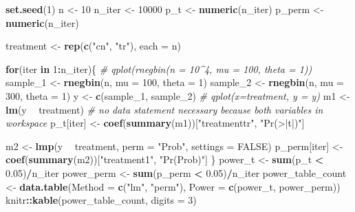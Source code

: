 \documentclass[]{book}
\newenvironment{Shaded}{\begin{snugshade}}{\end{snugshade}}
\newcommand{\CommentTok}[1]{\textcolor[rgb]{0.56,0.35,0.01}{\textit{#1}}}
\newcommand{\ControlFlowTok}[1]{\textcolor[rgb]{0.13,0.29,0.53}{\textbf{#1}}}
\newcommand{\DataTypeTok}[1]{\textcolor[rgb]{0.13,0.29,0.53}{#1}}
\newcommand{\DecValTok}[1]{\textcolor[rgb]{0.00,0.00,0.81}{#1}}
\newcommand{\FloatTok}[1]{\textcolor[rgb]{0.00,0.00,0.81}{#1}}
\newcommand{\KeywordTok}[1]{\textcolor[rgb]{0.13,0.29,0.53}{\textbf{#1}}}
\newcommand{\NormalTok}[1]{#1}
\newcommand{\OperatorTok}[1]{\textcolor[rgb]{0.81,0.36,0.00}{\textbf{#1}}}
\newcommand{\OtherTok}[1]{\textcolor[rgb]{0.56,0.35,0.01}{#1}}
\newcommand{\StringTok}[1]{\textcolor[rgb]{0.31,0.60,0.02}{#1}}
\begin{document}
\begin{Shaded}
\begin{Highlighting}[]
\KeywordTok{set.seed}\NormalTok{(}\DecValTok{1}\NormalTok{)}
\NormalTok{n <-}\StringTok{ }\DecValTok{10}
\NormalTok{n_iter <-}\StringTok{ }\DecValTok{10000}
\NormalTok{p_t <-}\StringTok{ }\KeywordTok{numeric}\NormalTok{(n_iter)}
\NormalTok{p_perm <-}\StringTok{ }\KeywordTok{numeric}\NormalTok{(n_iter)}

\NormalTok{treatment <-}\StringTok{ }\KeywordTok{rep}\NormalTok{(}\KeywordTok{c}\NormalTok{(}\StringTok{"cn"}\NormalTok{, }\StringTok{"tr"}\NormalTok{), }\DataTypeTok{each =}\NormalTok{ n)}

\ControlFlowTok{for}\NormalTok{(iter }\ControlFlowTok{in} \DecValTok{1}\OperatorTok{:}\NormalTok{n_iter)\{}
  \CommentTok{#  qplot(rnegbin(n = 10^4, mu = 100, theta = 1))}
\NormalTok{  sample_}\DecValTok{1}\NormalTok{ <-}\StringTok{ }\KeywordTok{rnegbin}\NormalTok{(n, }\DataTypeTok{mu =} \DecValTok{100}\NormalTok{, }\DataTypeTok{theta =} \DecValTok{1}\NormalTok{)}
\NormalTok{  sample_}\DecValTok{2}\NormalTok{ <-}\StringTok{ }\KeywordTok{rnegbin}\NormalTok{(n, }\DataTypeTok{mu =} \DecValTok{300}\NormalTok{, }\DataTypeTok{theta =} \DecValTok{1}\NormalTok{)}
\NormalTok{  y <-}\StringTok{ }\KeywordTok{c}\NormalTok{(sample_}\DecValTok{1}\NormalTok{, sample_}\DecValTok{2}\NormalTok{)}
  \CommentTok{# qplot(x=treatment, y = y)}
\NormalTok{  m1 <-}\StringTok{ }\KeywordTok{lm}\NormalTok{(y }\OperatorTok{~}\StringTok{ }\NormalTok{treatment) }\CommentTok{# no data statement necessary because both variables in workspace}
\NormalTok{  p_t[iter] <-}\StringTok{ }\KeywordTok{coef}\NormalTok{(}\KeywordTok{summary}\NormalTok{(m1))[}\StringTok{"treatmenttr"}\NormalTok{, }\StringTok{"Pr(>|t|)"}\NormalTok{]}
  
\NormalTok{  m2 <-}\StringTok{ }\KeywordTok{lmp}\NormalTok{(y }\OperatorTok{~}\StringTok{ }\NormalTok{treatment,}
            \DataTypeTok{perm =} \StringTok{"Prob"}\NormalTok{,}
            \DataTypeTok{settings =} \OtherTok{FALSE}\NormalTok{)}
\NormalTok{  p_perm[iter] <-}\StringTok{ }\KeywordTok{coef}\NormalTok{(}\KeywordTok{summary}\NormalTok{(m2))[}\StringTok{"treatment1"}\NormalTok{, }\StringTok{"Pr(Prob)"}\NormalTok{]}
\NormalTok{\}}
\NormalTok{power_t <-}\StringTok{ }\KeywordTok{sum}\NormalTok{(p_t }\OperatorTok{<}\StringTok{ }\FloatTok{0.05}\NormalTok{)}\OperatorTok{/}\NormalTok{n_iter}
\NormalTok{power_perm <-}\StringTok{ }\KeywordTok{sum}\NormalTok{(p_perm }\OperatorTok{<}\StringTok{ }\FloatTok{0.05}\NormalTok{)}\OperatorTok{/}\NormalTok{n_iter}
\NormalTok{power_table_count <-}\StringTok{ }\KeywordTok{data.table}\NormalTok{(}\DataTypeTok{Method =} \KeywordTok{c}\NormalTok{(}\StringTok{"lm"}\NormalTok{, }\StringTok{"perm"}\NormalTok{),}
                         \DataTypeTok{Power =} \KeywordTok{c}\NormalTok{(power_t, power_perm))}
\NormalTok{knitr}\OperatorTok{::}\KeywordTok{kable}\NormalTok{(power_table_count, }\DataTypeTok{digits =} \DecValTok{3}\NormalTok{)}
\end{Highlighting}
\end{Shaded}
\end{document}
